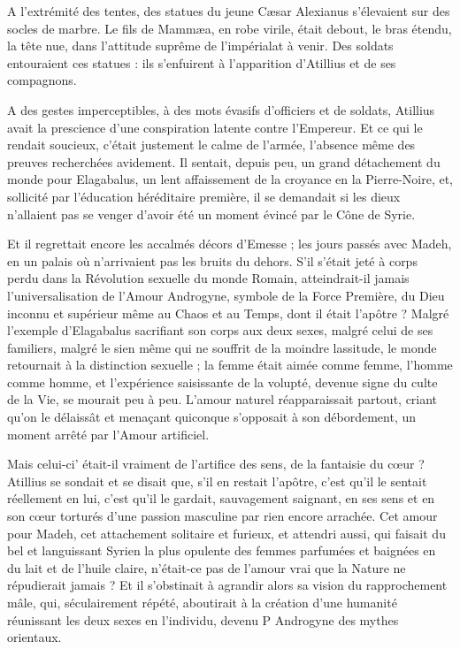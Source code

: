 \documentclass[a4paper, 11pt, oneside, polutonikogreek, french]{article}
\begin{document}
A l'extrémité des tentes, des statues du jeune Cæsar Alexianus s'élevaient sur des socles de marbre. Le fils de Mammæa, en robe virile, était debout, le bras étendu, la tête nue, dans l'attitude suprême de l'impérialat à venir. Des soldats entouraient ces statues : ils s'enfuirent à l'apparition d'Atillius et de ses compagnons.

A des gestes imperceptibles, à des mots évasifs d'officiers et de soldats, Atillius avait la prescience d'une conspiration latente contre l'Empereur. Et ce qui le rendait soucieux, c'était justement le calme de l'armée, l'absence même des preuves recherchées avidement. Il sentait, depuis peu, un grand détachement du monde pour Elagabalus, un lent affaissement de la croyance en la Pierre-Noire, et, sollicité par l'éducation héréditaire première, il se demandait si les dieux n'allaient pas se venger d'avoir été un moment évincé par le Cône de Syrie.

Et il regrettait encore les accalmés décors d'Emesse ; les jours passés avec Madeh, en un palais où n'arrivaient pas les bruits du dehors. S'il s'était jeté à corps perdu dans la Révolution sexuelle du monde Romain, atteindrait-il jamais l'universalisation de l'Amour Androgyne, symbole de la Force Première, du Dieu inconnu et supérieur même au Chaos et au Temps, dont il était l'apôtre ? Malgré l'exemple d'Elagabalus sacrifiant son corps aux deux sexes, malgré celui de ses familiers, malgré le sien même qui ne souffrit de la moindre lassitude, le monde retournait à la distinction sexuelle ; la femme était aimée comme femme, l'homme comme homme, et l'expérience saisissante de la volupté, devenue signe du culte de la Vie, se mourait peu à peu. L'amour naturel réapparaissait partout, criant qu'on le délaissât et menaçant quiconque s'opposait à son débordement, un moment arrêté par l'Amour artificiel.

Mais celui-ci' était-il vraiment de l'artifice des sens, de la fantaisie du cœur ? Atillius se sondait et se disait que, s'il en restait l'apôtre, c'est qu'il le sentait réellement en lui, c'est qu'il le gardait, sauvagement saignant, en ses sens et en son cœur torturés d'une passion masculine par rien encore arrachée. Cet amour pour Madeh, cet attachement solitaire et furieux, et attendri aussi, qui faisait du bel et languissant Syrien la plus opulente des femmes parfumées et baignées en du lait et de l'huile claire, n'était-ce pas de l'amour vrai que la Nature ne répudierait jamais ? Et il s'obstinait à agrandir alors sa vision du rapprochement mâle, qui, séculairement répété, aboutirait à la création d'une humanité réunissant les deux sexes en l'individu, devenu P Androgyne des mythes orientaux.
\end{document}
